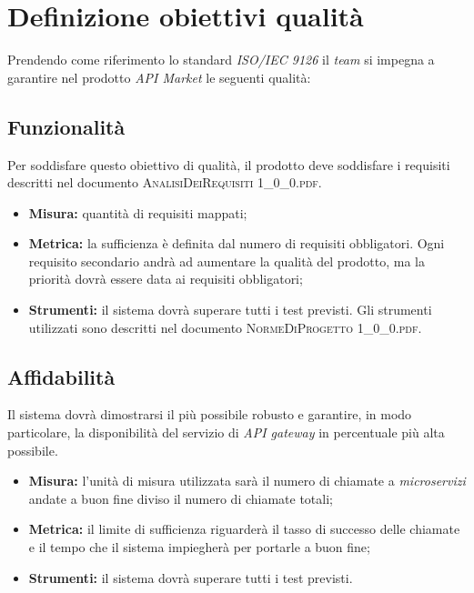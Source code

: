 \newpage
\section{Definizione obiettivi qualità}
	
	Prendendo come riferimento lo standard \textit{ISO/IEC 9126} il \textit{team} si impegna a
	garantire nel prodotto \textit{API Market} le seguenti qualità:
	
	\subsection{Funzionalità}
		Per soddisfare questo obiettivo di qualità, il prodotto deve soddisfare i requisiti descritti nel documento \textsc{AnalisiDeiRequisiti 1\_0\_0.pdf}.  
		
		\begin{itemize}
			\item \textbf{Misura: }quantità di requisiti mappati;
			\item \textbf{Metrica: }la sufficienza è definita dal numero di requisiti obbligatori. Ogni requisito secondario andrà ad aumentare la qualità del prodotto, ma la priorità dovrà essere data ai requisiti obbligatori;
			\item \textbf{Strumenti: }il sistema dovrà superare tutti i test previsti. Gli strumenti utilizzati sono descritti nel documento \textsc{NormeDiProgetto 1\_0\_0.pdf}.
			
		\end{itemize}
	
	\subsection{Affidabilità}
		Il sistema dovrà dimostrarsi il più possibile robusto e garantire, in modo particolare, la disponibilità del servizio di \textit{API gateway} in percentuale più alta possibile. 
		
		\begin{itemize}
			\item \textbf{Misura:} l'unità di misura utilizzata sarà il numero di chiamate a \textit{microservizi} andate a buon fine diviso il numero di chiamate totali;
			\item \textbf{Metrica: }il limite di sufficienza riguarderà il tasso di successo delle chiamate e il tempo che il sistema impiegherà per portarle a buon fine;
			\item \textbf{Strumenti: }il sistema dovrà superare tutti i test previsti.
			
		\end{itemize}
	

